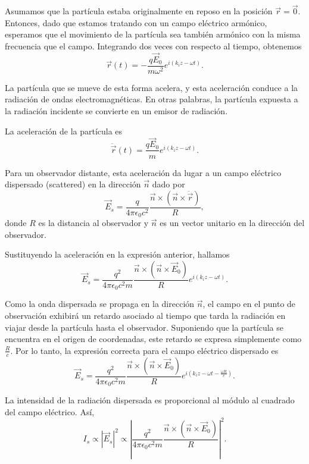 \documentclass[12pt,a4paper]{book}
\begin{document}
Asumamos que la partícula estaba originalmente en reposo en la posición $\vec{r} = \vec{0}$. Entonces, dado que estamos tratando con un campo eléctrico armónico, esperamos que el movimiento de la partícula sea también armónico con la misma frecuencia que el campo. Integrando dos veces con respecto al tiempo, obtenemos
\begin{equation}
\vec{r}(t) = -\frac{q\vec{E}_0}{m\omega^2}e^{i(k_iz-\omega t)}.
\end{equation}

La partícula que se mueve de esta forma acelera, y esta aceleración conduce a la radiación de ondas electromagnéticas. En otras palabras, la partícula expuesta a la radiación incidente se convierte en un emisor de radiación.

La aceleración de la partícula es
\begin{equation}
\ddot{\vec{r}}(t) = \frac{q\vec{E}_0}{m}e^{i(k_iz-\omega t)}.
\end{equation}

Para un observador distante, esta aceleración da lugar a un campo eléctrico dispersado (scattered) en la dirección $\vec{n}$ dado por
\begin{equation}
\vec{E}_s = \frac{q}{4\pi\epsilon_0c^2}\frac{\vec{n} \times (\vec{n} \times \ddot{\vec{r}})}{R},
\end{equation}
donde $R$ es la distancia al observador y $\vec{n}$ es un vector unitario en la dirección del observador.

Sustituyendo la aceleración en la expresión anterior, hallamos
\begin{equation}
\vec{E}_s = \frac{q^2}{4\pi\epsilon_0c^2m}\frac{\vec{n} \times (\vec{n} \times \vec{E}_0)}{R}e^{i(k_iz-\omega t)}.
\end{equation}

Como la onda dispersada se propaga en la dirección $\vec{n}$, el campo en el punto de observación exhibirá un retardo asociado al tiempo que tarda la radiación en viajar desde la partícula hasta el observador. Suponiendo que la partícula se encuentra en el origen de coordenadas, este retardo se expresa simplemente como $\frac{R}{c}$. Por lo tanto, la expresión correcta para el campo eléctrico dispersado es
\begin{equation}
\vec{E}_s = \frac{q^2}{4\pi\epsilon_0c^2m}\frac{\vec{n} \times (\vec{n} \times \vec{E}_0)}{R}e^{i(k_iz-\omega t-\frac{\omega R}{c})}.
\end{equation}

La intensidad de la radiación dispersada es proporcional al módulo al cuadrado del campo eléctrico. Así,
\begin{equation}
I_s \propto |\vec{E}_s|^2 \propto \left|\frac{q^2}{4\pi\epsilon_0c^2m}\frac{\vec{n} \times (\vec{n} \times \vec{E}_0)}{R}\right|^2.
\end{equation}
\end{document}
